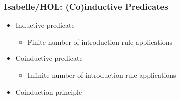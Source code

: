 \documentclass[aspectratio=169,10pt]{beamer}
\begin{document}
\begin{frame}[fragile]
  \frametitle{Isabelle/HOL: (Co)inductive Predicates}
  \begin{itemize}
    \item Inductive predicate
          \begin{itemize}
            \item Finite number of introduction rule applications
          \end{itemize}

          \pause
    \item Coinductive predicate
          \begin{itemize}
            \item Infinite number of introduction rule applications
          \end{itemize}

          \pause
    \item Coinduction principle
  \end{itemize}
\end{frame}


\end{document}
